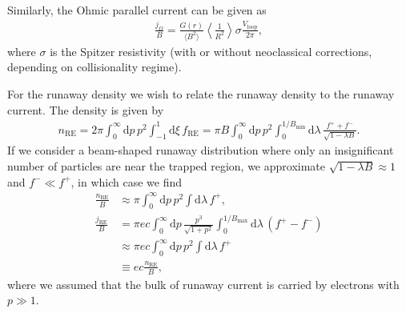 \documentclass[11pt,a4paper]{article}
\newcommand{\rd}{\ensuremath{\mathrm{d}}}
\newcommand{\sub}[1]{\ensuremath{_{\text{#1}}}}
\begin{document}
Similarly, the Ohmic parallel current can be given as
\begin{align}
\frac{j_\Omega}{B} = \frac{G(r)}{\langle B^2\rangle}\left\langle \frac{1}{R^2} \right\rangle  \sigma\frac{V\sub{loop}}{2\pi},
\end{align}
where $\sigma$ is the Spitzer resistivity (with or without neoclassical corrections, depending on collisionality regime).

For the runaway density we wish to relate the runaway density to the runaway current. The density is given by
\begin{align}
n\sub{RE} = 2\pi\int_0^\infty \rd p \, p^2 \int_{-1}^1 \rd \xi \, f\sub{RE} = \pi B \int_0^\infty \rd p \, p^2 \int_0^{1/B\sub{min}} \rd\lambda \, \frac{f^+ + f^-}{\sqrt{1-\lambda B}}.
\end{align}
If we consider a beam-shaped runaway distribution where only an insignificant number of particles are near the trapped region, we approximate $\sqrt{1-\lambda B} \approx 1$ and $f^- \ll f^+$, in which case we find
\begin{align}
\frac{n\sub{RE}}{B} &\approx \pi \int_0^\infty \rd p \, p^2 \int \rd \lambda\, f^+, \nonumber \\
\frac{j\sub{RE}}{B} &=  \pi ec \int_0^\infty \rd p \, \frac{p^3}{\sqrt{1+p^2}} \int_0^{1/B\sub{max}} \rd \lambda \,(f^+-f^-) \nonumber \\
&\approx \pi e c \int_0^\infty \rd p \, p^2 \int \rd \lambda \,f^+ \nonumber \\
&\equiv ec \frac{n\sub{RE}}{B},
\end{align}
where we assumed that the bulk of runaway current is carried by electrons with $p \gg 1$.
\end{document}
